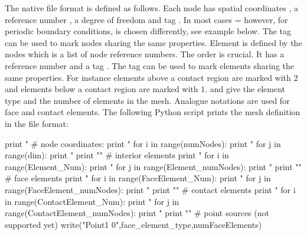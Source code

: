 The native \finley file format is defined as follows.
Each node  has  spatial coordinates , a reference number
, a degree of freedom  and tag .
In most cases = however, for periodic boundary conditions,
 is chosen differently, see example below. The tag can be used to mark nodes sharing
the same properties. Element  is defined by the  nodes 
which is a list of node reference numbers. The order is crucial.
It has a reference number  and a tag . The tag 
can be used to mark elements  sharing the same properties. For instance elements above 
a contact region are marked with $2$ and elements below a contact region are marked with $1$. 
 and  give the element type and the number of elements in the mesh.
Analogue notations are used for face and contact elements. The following Python script
prints the mesh definition in the \finley file format:
\begin{python}
print "%
# node coordinates:
print "%
for i in range(numNodes): 
   print "%
   for j in range(dim): print " %
   print "\n"
# interior elements
print "%
for i in range(Element_Num):
   print "%
   for j in range(Element_numNodes): print " %
   print "\n"
# face elements
print "%
for i in range(FaceElement_Num):
   print "%
   for j in range(FaceElement_numNodes): print " %
   print "\n"
# contact elements
print "%
for i in range(ContactElement_Num):
   print "%
   for j in range(ContactElement_numNodes): print " %
   print "\n"
# point sources (not supported yet)
write("Point1 0",face_element_type,numFaceElements)
\end{python}

